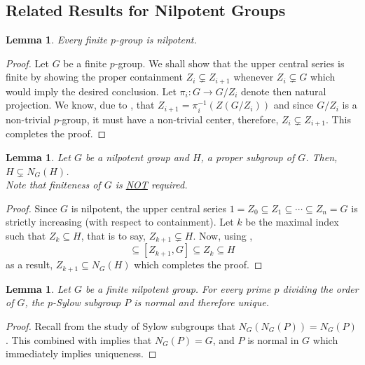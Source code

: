 \documentclass[12pt]{article}
\theoremstyle{thmstyle}
\newtheorem{lemma}[theorem]{Lemma}
\theoremstyle{defstyle}
\begin{document}
\subsection{Related Results for Nilpotent Groups}

\begin{lemma}
    Every finite $p$-group is nilpotent.
\end{lemma}
\begin{proof}
    Let $G$ be a finite $p$-group. We shall show that the upper central series is finite by showing the proper containment $Z_i\subsetneq Z_{i + 1}$ whenever $Z_i\subsetneq G$ which would imply the desired conclusion. Let $\pi_i: G\to G/Z_i$ denote then natural projection. We know, due to , that $Z_{i + 1} = \pi_i^{-1}(Z(G/Z_i))$ and since $G/Z_i$ is a non-trivial $p$-group, it must have a non-trivial center, therefore, $Z_i\subsetneq Z_{i + 1}$. This completes the proof.
\end{proof}

\begin{lemma}
    Let $G$ be a nilpotent group and $H$, a proper subgroup of $G$. Then, $H\subsetneq N_G(H)$.\\
    \textit{Note that finiteness of $G$ is \underline{NOT} required}.
\end{lemma}
\begin{proof}
    Since $G$ is nilpotent, the upper central series $1 = Z_0\subseteq Z_1\subseteq\cdots\subseteq Z_n = G$ is strictly increasing (with respect to containment). Let $k$ be the maximal index such that $Z_k\subseteq H$, that is to say, $Z_{k + 1}\subsetneq H$. Now, using ,
    \begin{equation*}
        [Z_{k + 1}, H]\subseteq [Z_{k + 1}, G]\subseteq Z_k\subseteq H
    \end{equation*}
    as a result, $Z_{k + 1}\subseteq N_G(H)$ which completes the proof.
\end{proof}

\begin{lemma}
    Let $G$ be a finite nilpotent group. For every prime $p$ dividing the order of $G$, the $p$-Sylow subgroup $P$ is normal and therefore unique.
\end{lemma}
\begin{proof}
    Recall from the study of Sylow subgroups that $N_G(N_G(P)) = N_G(P)$. This combined with  implies that $N_G(P) = G$, and $P$ is normal in $G$ which immediately implies uniqueness.
\end{proof}
\end{document}
